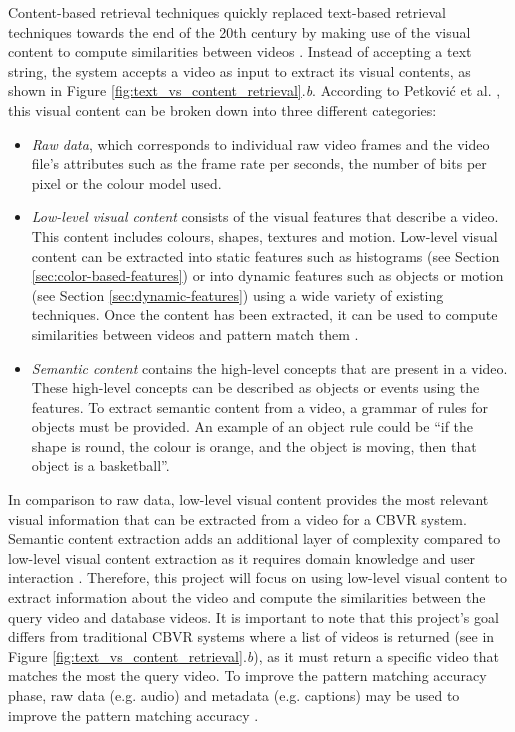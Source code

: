 Content-based retrieval techniques quickly replaced text-based retrieval techniques towards the end of the 20th century by making use of the visual content to compute similarities between videos \cite{lai2015trajectory}. Instead of accepting a text string, the system accepts a video as input to extract its visual contents, as shown in Figure \ref{fig:text_vs_content_retrieval}.\emph{b}. According to Petković et al. \cite{petkovic2000}, this visual content can be broken down into three different categories:

\begin{itemize}
    
    \item \textit{Raw data}, which corresponds to individual raw video frames and the video file's attributes such as the frame rate per seconds, the number of bits per pixel or the colour model used.
    
    \item \textit{Low-level visual content} consists of the visual features that describe a video. This content includes colours, shapes, textures and motion. Low-level visual content can be extracted into static features such as histograms (see Section \ref{sec:color-based-features}) or into dynamic features such as objects or motion (see Section \ref{sec:dynamic-features}) using a wide variety of existing techniques. Once the content has been extracted, it can be used to compute similarities between videos and pattern match them \cite{lai2015trajectory}.
    
    \item \textit{Semantic content} contains the high-level concepts that are present in a video. These high-level concepts can be described as objects or events using the features. To extract semantic content from a video, a grammar of rules for objects must be provided. An example of an object rule could be ``if the shape is round, the colour is orange, and the object is moving, then that object is a basketball''.

\end{itemize}

In comparison to raw data, low-level visual content provides the most relevant visual information that can be extracted from a video for a CBVR system. Semantic content extraction adds an additional layer of complexity compared to low-level visual content extraction as it requires domain knowledge and user interaction \cite{petkovic2000}. Therefore, this project will focus on using low-level visual content to extract information about the video and compute the similarities between the query video and database videos. It is important to note that this project's goal differs from traditional CBVR systems where a list of videos is returned (see in Figure \ref{fig:text_vs_content_retrieval}.\emph{b}), as it must return a specific video that matches the most the query video. To improve the pattern matching accuracy phase, raw data (e.g. audio) and metadata (e.g. captions) may be used to improve the pattern matching accuracy \cite{patel2012}.\\

